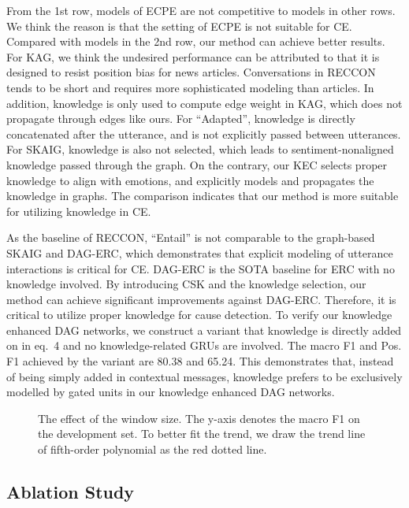 \documentclass{article}
\begin{document}
From the 1st row, models of ECPE are not competitive to models in other rows. We think the reason is that the setting of ECPE is not suitable for CE. Compared with models in the 2nd row, our method can achieve better results. For KAG, we think the undesired performance can be attributed to that it is designed to resist position bias for news articles. Conversations in RECCON tends to be short and requires more sophisticated modeling than articles. In addition, knowledge is only used to compute edge weight in KAG, which does not propagate through edges like ours. For ``Adapted'', knowledge is directly concatenated after the utterance, and is not explicitly passed between utterances. For SKAIG, knowledge is also not selected, which leads to sentiment-nonaligned knowledge passed through the graph. On the contrary, our KEC selects proper knowledge to align with emotions, and explicitly models and propagates the knowledge in graphs. The comparison indicates that our method is more suitable for utilizing knowledge in CE. 


As the baseline of RECCON, ``Entail'' is not comparable to the graph-based SKAIG and DAG-ERC, which demonstrates that explicit modeling of utterance interactions is critical for CE. DAG-ERC is the SOTA baseline for ERC with no knowledge involved. By introducing CSK and the knowledge selection, our method can achieve significant improvements against DAG-ERC. Therefore, it is critical to utilize proper knowledge for cause detection. To verify our knowledge enhanced DAG networks, we construct a variant that knowledge  is directly added on  in eq.~4 and no knowledge-related GRUs are involved. The macro F1 and Pos. F1 achieved by the variant are 80.38 and 65.24. This demonstrates that, instead of being simply added in contextual messages, knowledge prefers to be exclusively modelled by gated units in our knowledge enhanced DAG networks. 

\begin{figure}
    \centering
    \vspace{-0.3cm}
    \vspace{-0.2cm}
    \caption{The effect of the window size. The y-axis denotes the macro F1 on the development set. To better fit the trend, we draw the trend line of fifth-order polynomial as the red dotted line. }
    \vspace{-0.2cm}
    \label{window}
\end{figure}

\subsection{Ablation Study}
\end{document}
